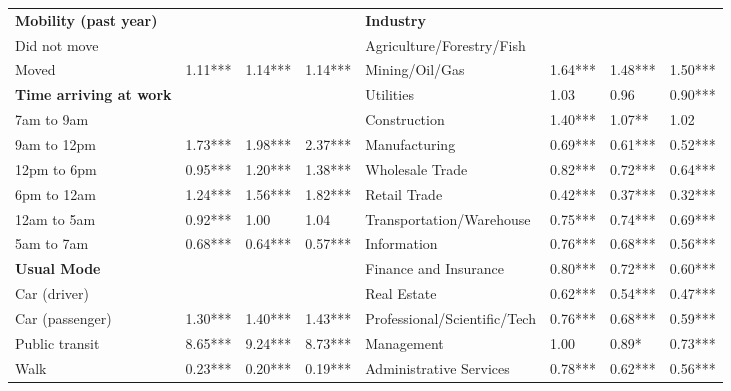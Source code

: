\documentclass[10 pt,letterpaper]{article}
\begin{document}
\begin{table}[H]
{\begin{tabular}{llllllll}
			\textbf{Mobility (past year)}  &           &          &          & \textbf{Industry}             &           &          &          \\
			Did not move                   &           &          &          & Agriculture/Forestry/Fish     &           &          &          \\
			Moved                          & 1.11***   & 1.14***  & 1.14***  & Mining/Oil/Gas                & 1.64***   & 1.48***  & 1.50***  \\
			\textbf{Time arriving at work} &           &          &          & Utilities                     & 1.03      & 0.96     & 0.90***  \\
			7am to 9am                     &           &          &          & Construction                  & 1.40***   & 1.07**   & 1.02     \\
			9am to 12pm                    & 1.73***   & 1.98***  & 2.37***  & Manufacturing                 & 0.69***   & 0.61***  & 0.52***  \\
			12pm to 6pm                    & 0.95***   & 1.20***  & 1.38***  & Wholesale Trade               & 0.82***   & 0.72***  & 0.64***  \\
			6pm to 12am                    & 1.24***   & 1.56***  & 1.82***  & Retail Trade                  & 0.42***   & 0.37***  & 0.32***  \\
			12am to 5am                    & 0.92***   & 1.00     & 1.04     & Transportation/Warehouse      & 0.75***   & 0.74***  & 0.69***  \\
			5am to 7am                     & 0.68***   & 0.64***  & 0.57***  & Information                   & 0.76***   & 0.68***  & 0.56***  \\
			\textbf{Usual Mode}            &           &          &          & Finance and Insurance         & 0.80***   & 0.72***  & 0.60***  \\
			Car (driver)                   &           &          &          & Real Estate                   & 0.62***   & 0.54***  & 0.47***  \\
			Car (passenger)                & 1.30***   & 1.40***  & 1.43***  & Professional/Scientific/Tech  & 0.76***   & 0.68***  & 0.59***  \\
			Public transit                 & 8.65***   & 9.24***  & 8.73***  & Management                    & 1.00      & 0.89*    & 0.73***  \\
			Walk                           & 0.23***   & 0.20***  & 0.19***  & Administrative Services       & 0.78***   & 0.62***  & 0.56***  \\

\end{tabular}}
\end{table}
\end{document}
